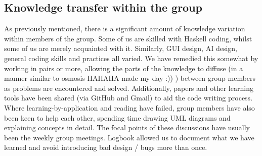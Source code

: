 \documentclass[11pt]{article}
\begin{document}
\subsection{Knowledge transfer within the group}
As previously mentioned, there is a significant amount of knowledge variation
within members of the group. Some of us are skilled with Haskell coding, whilst
some of us are merely acquainted with it. Similarly, GUI design, AI design,
general coding skills and practices all varied. We have remedied this 
somewhat by working in pairs or more, allowing the parts of the knowledge to 
diffuse (in a manner similar to osmosis HAHAHA made my day :)) ) between group
members as problems are encountered and solved. Additionally, papers and other
learning tools have been shared (via GitHub and Gmail) to aid the code writing
process. Where  learning-by-application and reading have failed, group members have also been
keen to help each other, spending time drawing UML diagrams and explaining concepts
in detail. The focal points of these discussions have usually been the weekly 
group meetings. Logbook allowed us to document what we have learned and avoid
introducing bad design / bugs more than once.
\end{document}
